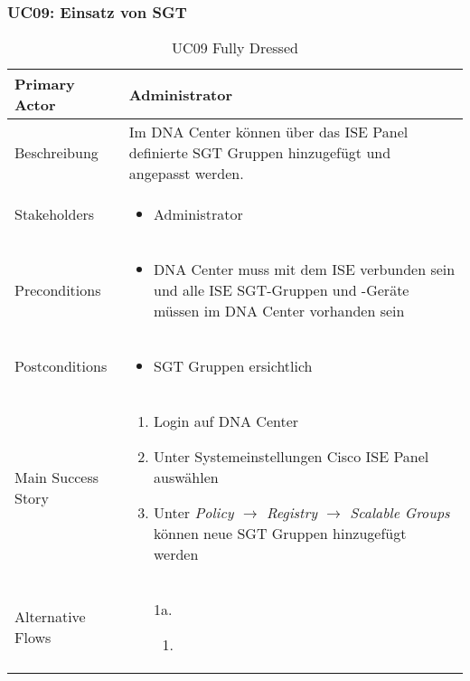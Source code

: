 \subsubsection{UC09: Einsatz von SGT}
\begin{table}[H]
	\centering
	\begin{tabularx}{\textwidth}{l | X}
		Primary Actor   & Administrator       \\
		\hline
		Beschreibung   & Im DNA Center können über das ISE Panel definierte SGT Gruppen hinzugefügt und angepasst werden.  \\ 
		\hline
		Stakeholders       & 
		\begin{itemize}
			\item Administrator
		\end{itemize} \\ 
		Preconditions      & 
		\begin{itemize}	
			\item DNA Center muss mit dem ISE verbunden sein und alle ISE SGT-Gruppen und -Geräte müssen im DNA Center vorhanden sein
		\end{itemize}  \\
		\hline
		Postconditions     & 
		\begin{itemize}	
			\item SGT Gruppen ersichtlich
		\end{itemize}  \\
		\hline
		Main Success Story & 
		\begin{enumerate}
			\item Login auf DNA Center
			\item Unter Systemeinstellungen Cisco ISE Panel auswählen
			\item Unter \textit{Policy $\rightarrow$ Registry $\rightarrow$ Scalable Groups} können neue SGT Gruppen hinzugefügt werden
		\end{enumerate}
		\\
		\hline
		Alternative Flows  & 
		\begin{itemize}
			\item[1a.]  
			\begin{enumerate}
				\item 
			\end{enumerate}
		\end{itemize}
	\end{tabularx}
	\caption{UC09 Fully Dressed}
	\label{tab:UC09}
\end{table}

